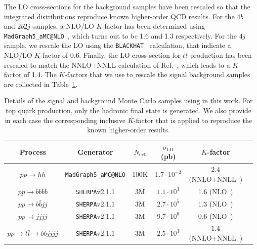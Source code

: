 The LO cross-sections for
the background samples have been rescaled so that the integrated
distributions reproduce known higher-order QCD results.
%
For the $4b$ and $2b2j$ samples, a NLO/LO $K$-factor has been determined
using {\tt MadGraph5\_aMC@NLO}~\cite{Alwall:2014hca}, which turns out to be 1.6 and 1.3
respectively.
%
For the $4j$ sample, we rescale the LO
using the {\tt BLACKHAT}~\cite{Bern:2011ep}
calculation, that indicate
a NLO/LO $K$-factor of 0.6.
%
Finally, the LO cross-section for $t\bar{t}$ production has been rescaled
to match the NNLO+NNLL calculation of Ref.~\cite{Czakon:2013goa}, which leads
to a $K$-factor of 1.4.
%
The $K$-factors that we use to rescale
the signal background samples are collected in
Table~\ref{tab:samples}.


\begin{table}[h]
  \small
\begin{center}
\begin{tabular}{|c|c|c|c|c|c|}
\hline
Process &  Generator & $N_{\mathrm{evt}}$ & $\sigma_{\mathrm{LO}}$ (pb)  & $K$-factor \\
\hline
\hline
$pp \to hh$ &  {\tt MadGraph5\_aMC@NLO} & 100K & $1.7\cdot10^{-2}$  &  2.4  (NNLO+NNLL~\cite{deFlorian:2013jea,deFlorian:2015moa}) \\
\hline
\hline
$pp \to b\bar{b}b\bar{b}$ &  {\tt SHERPA}v2.1.1 & 3M &$1.1 \cdot10^3$  & 1.6 (NLO~\cite{Alwall:2014hca}) \\
$pp \to b\bar{b}jj$ &  {\tt SHERPA}v2.1.1 & 3M & $2.7 \cdot 10^5$ & 1.3 (NLO~\cite{Alwall:2014hca}) \\
$pp \to jjjj$ &  {\tt SHERPA}v2.1.1 & 3M  & $9.7\cdot 10^6$ &  0.6 (NLO~\cite{Bern:2011ep})\\
$pp \to t\bar{t}\to b\bar{b}jjjj$ &  {\tt SHERPA}v2.1.1 & 3M & $2.5\cdot 10^3$   & 1.4 (NNLO+NNLL~\cite{Czakon:2013goa})\\
\hline
\end{tabular}
\caption{\small Details of the signal and background Monte
  Carlo samples using in this work.
  For top quark production, only the hadronic final state is generated.
We also provide in each case the corresponding inclusive $K$-factor
  that is applied to reproduce the known
  higher-order results. \label{tab:samples}
} 
\end{center}
\end{table}%


